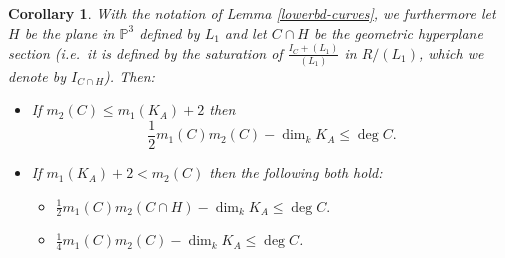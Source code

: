 \documentclass[12pt,twoside]{amsart}
\numberwithin{equation}{section}
\newtheorem{corollary}[theorem]{Corollary}
\theoremstyle{definition}
\begin{document}
\begin{corollary} \label{cor-curves}
With the notation of Lemma \ref{lowerbd-curves}, we furthermore let $H$ be the plane in
${\mathbb P}^3$ defined by $L_1$ and let $C \cap H$ be the geometric hyperplane section
(i.e.\ it is defined by the saturation of $\frac{I_C + (L_1)}{(L_1)}$ in $R/(L_1)$, which
we denote by $I_{C \cap H}$). Then:
\begin{itemize}
\item[(a)] If $m_2(C) \leq m_1(K_A)+2$ then
\[
\frac{1}{2} m_1(C) m_2(C) - \dim_k K_A \leq \deg C .
\]

\item[(b)] If $m_1(K_A) +2 < m_2(C)$ then the following both hold:

\begin{itemize}

\item[(i)] $\displaystyle \frac{1}{2} m_1(C) m_2(C \cap H) - \dim_k K_A \leq \deg C .$ \\

\item[(ii)] $\displaystyle \frac{1}{4} m_1(C) m_2(C) - \dim_k K_A \leq \deg C $.
\end{itemize}
\end{itemize}
\end{corollary}
\end{document}

